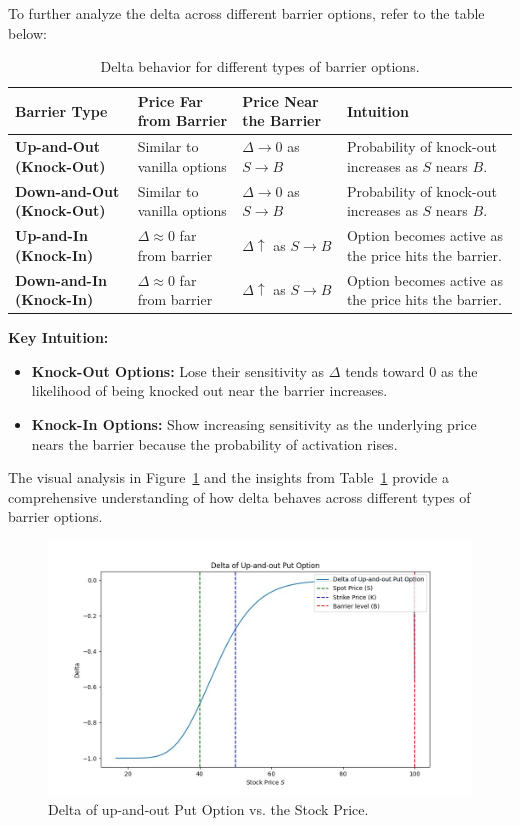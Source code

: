 To further analyze the delta across different barrier options, refer to the table below:

\begin{table}[htbp]
\centering
\begin{tabularx}{\textwidth}{|X|X|X|X|}
\hline
\textbf{Barrier Type}         & \textbf{Price Far from Barrier} & \textbf{Price Near the Barrier} & \textbf{Intuition}                              \\ 
\hline
\textbf{Up-and-Out (Knock-Out)} & Similar to vanilla options     & $\Delta \to 0$ as $S \to B$  & Probability of knock-out increases as $S$ nears $B$. \\ 
\hline
\textbf{Down-and-Out (Knock-Out)} & Similar to vanilla options     & $\Delta \to 0$ as $S \to B$  & Probability of knock-out increases as $S$ nears $B$. \\ 
\hline
\textbf{Up-and-In (Knock-In)}    & $\Delta \approx 0$ far from barrier   & $\Delta \uparrow$ as $S \to B$  & Option becomes active as the price hits the barrier. \\ 
\hline
\textbf{Down-and-In (Knock-In)}  & $\Delta \approx 0$ far from barrier   & $\Delta \uparrow$ as $S \to B$  & Option becomes active as the price hits the barrier. \\ 
\hline
\end{tabularx}
\caption{Delta behavior for different types of barrier options.}
\label{tab:delta_barrier_options}
\end{table}

\textbf{Key Intuition:}
\begin{itemize}
    \item \textbf{Knock-Out Options:} Lose their sensitivity as $\Delta$ tends toward $0$ as the likelihood of being knocked out near the barrier increases.
    \item \textbf{Knock-In Options:} Show increasing sensitivity as the underlying price nears the barrier because the probability of activation rises.
\end{itemize}

The visual analysis in Figure~\ref{fig:delta_upout} and the insights from Table~\ref{tab:delta_barrier_options} provide a comprehensive understanding of how delta behaves across different types of barrier options.
\begin{figure}[h]
    \centering
    \includegraphics[width=.65\linewidth]{content/images/delta_upout.png}
    \caption{Delta of up-and-out Put Option vs. the Stock Price.}
    \label{fig:delta_upout}
\end{figure}

